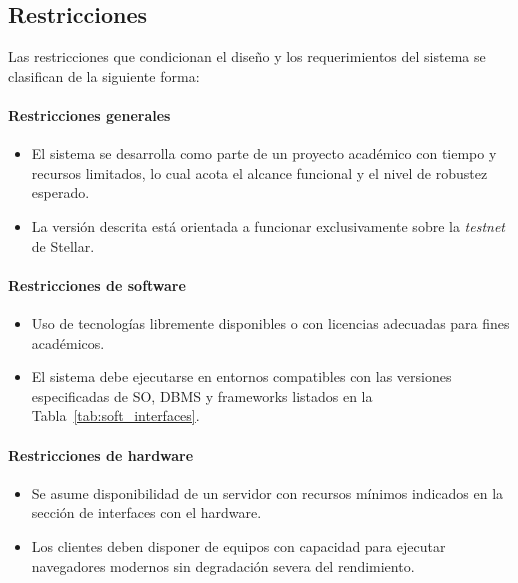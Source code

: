 \documentclass[12pt,letterpaper]{article}
\begin{document}
\subsection{Restricciones}

Las restricciones que condicionan el diseño y los requerimientos del sistema se
clasifican de la siguiente forma:

\paragraph{Restricciones generales}

\begin{itemize}
    \item El sistema se desarrolla como parte de un proyecto académico con
          tiempo y recursos limitados, lo cual acota el alcance funcional y el
          nivel de robustez esperado.
    \item La versión descrita está orientada a funcionar exclusivamente sobre
          la \textit{testnet} de Stellar.
\end{itemize}

\paragraph{Restricciones de software}

\begin{itemize}
    \item Uso de tecnologías libremente disponibles o con licencias adecuadas
          para fines académicos.
    \item El sistema debe ejecutarse en entornos compatibles con las versiones
          especificadas de SO, DBMS y frameworks listados en la
          Tabla~\ref{tab:soft_interfaces}.
\end{itemize}

\paragraph{Restricciones de hardware}

\begin{itemize}
    \item Se asume disponibilidad de un servidor con recursos mínimos
          indicados en la sección de interfaces con el hardware.
    \item Los clientes deben disponer de equipos con capacidad para ejecutar
          navegadores modernos sin degradación severa del rendimiento.
\end{itemize}
\end{document}
